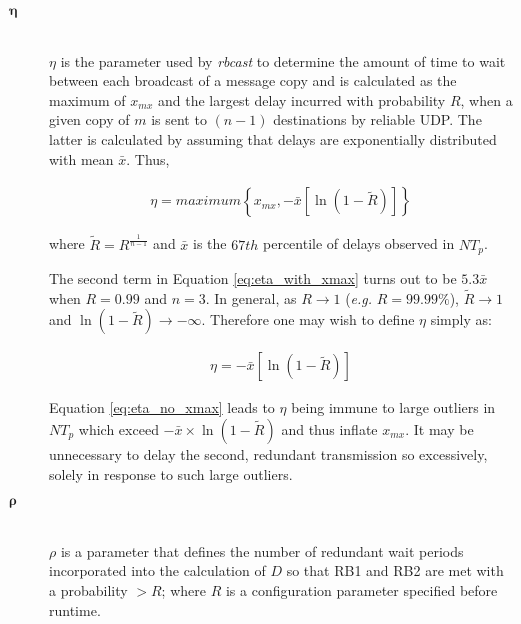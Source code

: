 \begin{description}
        \item[\Huge$\boldsymbol{\eta}$] \hfill \\
        $\eta$ is the parameter used by \emph{rbcast} to determine the amount of time to wait between each broadcast of a message copy and is calculated as the maximum of $x_{mx}$ and the largest delay incurred with probability $R$, when a given copy of $m$ is sent to $(n-1)$ destinations by reliable UDP.  The latter is calculated by assuming that delays are exponentially distributed with mean $\bar{x}$.  Thus,
        
        \begin{equation}
        \label{eq:eta_with_xmax}
            \begin{aligned}
                \eta = maximum \left\{ x_{mx}, -\bar{x}[\ln(1-\tilde{R})] \right\}
            \end{aligned}
        \end{equation}        
       
       where $\tilde{R} = R^{\frac{1}{n-1}}$ and $\bar{x}$ is the $67th$ percentile of delays observed in $NT_p$.  
        
        The second term in Equation \ref{eq:eta_with_xmax} turns out to be $5.3\bar{x}$ when $R = 0.99$ and $n=3$.  In general, as $R \rightarrow 1$ (\emph{e.g.} $R = 99.99\%$), $\tilde{R} \rightarrow 1$ and $\ln(1-\tilde{R}) \rightarrow -\infty$.  Therefore one may wish to define $\eta$ simply as:
        
        \begin{equation}
        \label{eq:eta_no_xmax}
            \begin{aligned}
                \eta=-\bar{x}[\ln(1-\tilde{R})]  
            \end{aligned}
        \end{equation}
        
        Equation \ref{eq:eta_no_xmax} leads to $\eta$ being immune to large outliers in $NT_p$ which exceed $-\bar{x} \times \ln(1 - \tilde{R})$ and thus inflate $x_{mx}$.  It may be unnecessary to delay the second, redundant transmission so excessively, solely in response to such large outliers.  

        \item[\Huge$\boldsymbol{\rho}$] \hfill \\
        $\rho$ is a parameter that defines the number of redundant wait periods incorporated into the calculation of $D$ so that RB1 and RB2 are met with a probability $> R$; where $R$ is a configuration parameter specified before runtime.  
        

\end{description}
